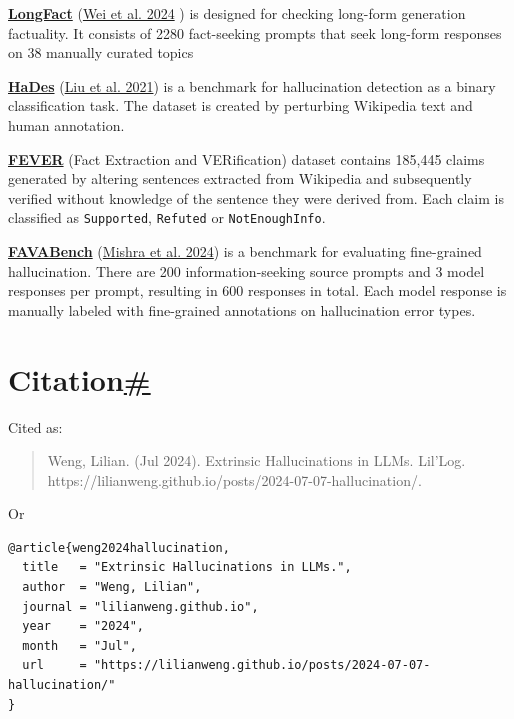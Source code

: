 \href{https://github.com/google-deepmind/long-form-factuality/tree/main/longfact}{\textbf{LongFact}} (\href{https://arxiv.org/abs/2403.18802}{Wei et al. 2024} ) is designed for checking long-form generation factuality. It consists of 2280 fact-seeking prompts that seek long-form responses on 38 manually curated topics

\href{https://github.com/microsoft/HaDes}{\textbf{HaDes}} (\href{https://arxiv.org/abs/2104.08704}{Liu et al. 2021}) is a benchmark for hallucination detection as a binary classification task. The dataset is created by perturbing Wikipedia text and human annotation.

\href{https://fever.ai/dataset/fever.html}{\textbf{FEVER}} (Fact Extraction and VERification) dataset contains 185,445 claims generated by altering sentences extracted from Wikipedia and subsequently verified without knowledge of the sentence they were derived from. Each claim is classified as \texttt{Supported}, \texttt{Refuted} or \texttt{NotEnoughInfo}.

\href{https://huggingface.co/datasets/fava-uw/fava-data}{\textbf{FAVABench}} (\href{https://arxiv.org/abs/2401.06855}{Mishra et al. 2024}) is a benchmark for evaluating fine-grained hallucination. There are 200 information-seeking source prompts and 3 model responses per prompt, resulting in 600 responses in total. Each model response is manually labeled with fine-grained annotations on hallucination error types.

\section{\texorpdfstring{Citation\hyperref[citation]{\#}}{Citation\#}}\label{citation}

Cited as:

\begin{quote}
Weng, Lilian. (Jul 2024). Extrinsic Hallucinations in LLMs. Lil'Log. https://lilianweng.github.io/posts/2024-07-07-hallucination/.
\end{quote}

Or

\begin{verbatim}
@article{weng2024hallucination,
  title   = "Extrinsic Hallucinations in LLMs.",
  author  = "Weng, Lilian",
  journal = "lilianweng.github.io",
  year    = "2024",
  month   = "Jul",
  url     = "https://lilianweng.github.io/posts/2024-07-07-hallucination/"
}
\end{verbatim}

